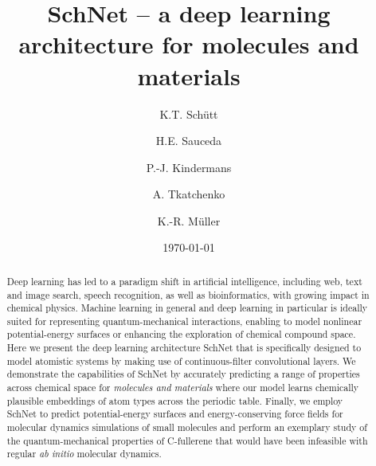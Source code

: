 \documentclass[aip,jcp,reprint,graphicx]{revtex4-1}
\begin{document}
\title{SchNet -- a deep learning architecture for molecules and materials} 





\author{K.T. Sch\"utt}


\author{H.E. Sauceda}

\author{P.-J. Kindermans}

\author{A. Tkatchenko}

\author{K.-R. M\"uller}

\date{\today}

\begin{abstract}
Deep learning has led to a paradigm shift in artificial intelligence, including web, text and image search, speech recognition, as well as bioinformatics, with growing impact in chemical physics. Machine learning in general and deep learning in particular is ideally suited for representing quantum-mechanical interactions, enabling to model nonlinear potential-energy surfaces or enhancing the exploration of chemical compound space.
Here we present the deep learning architecture SchNet that is specifically designed to model atomistic systems by making use of continuous-filter convolutional layers.
We demonstrate the capabilities of SchNet by accurately predicting a range of properties across chemical space for \emph{molecules and materials} where our model learns chemically plausible embeddings of atom types across the periodic table.
Finally, we employ SchNet to predict potential-energy surfaces and energy-conserving force fields for molecular dynamics simulations of small molecules and perform an exemplary study of the quantum-mechanical properties of C-fullerene that would have been infeasible with regular \textit{ab initio} molecular dynamics.
\end{abstract}
\end{document}
